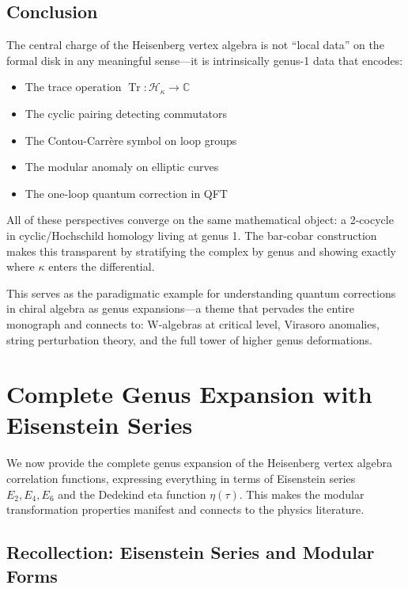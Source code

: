\subsection{Conclusion}

The central charge of the Heisenberg vertex algebra is not ``local data'' on the formal disk in any meaningful sense---it is intrinsically genus-1 data that encodes:
\begin{itemize}
\item The trace operation $\operatorname{Tr}: \mathcal{H}_\kappa \to \mathbb{C}$
\item The cyclic pairing detecting commutators
\item The Contou-Carrère symbol on loop groups
\item The modular anomaly on elliptic curves
\item The one-loop quantum correction in QFT
\end{itemize}

All of these perspectives converge on the same mathematical object: a 2-cocycle in cyclic/Hochschild homology living at genus 1. The bar-cobar construction makes this transparent by stratifying the complex by genus and showing exactly where $\kappa$ enters the differential.

This serves as the paradigmatic example for understanding quantum corrections in chiral algebra as genus expansions---a theme that pervades the entire monograph and connects to: W-algebras at critical level, Virasoro anomalies, string perturbation theory, and the full tower of higher genus deformations.

\section{Complete Genus Expansion with Eisenstein Series}
\label{sec:heisenberg-genus-expansion-eisenstein}

We now provide the complete genus expansion of the Heisenberg vertex algebra 
correlation functions, expressing everything in terms of Eisenstein series 
$E_2, E_4, E_6$ and the Dedekind eta function $\eta(\tau)$. This makes the 
modular transformation properties manifest and connects to the physics literature.

\subsection{Recollection: Eisenstein Series and Modular Forms}
\label{subsec:eisenstein-recollection}

